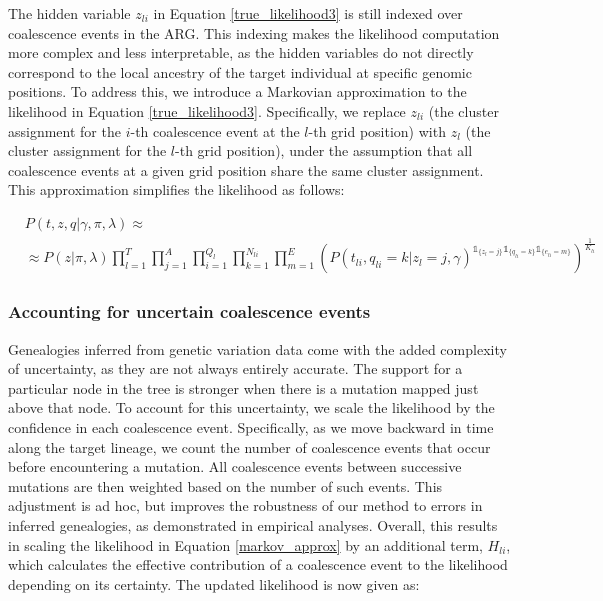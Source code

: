 The hidden variable \( z_{li} \) in Equation \ref{true_likelihood3} is still indexed over coalescence events in the ARG. This indexing makes the likelihood computation more complex and less interpretable, as the hidden variables do not directly correspond to the local ancestry of the target individual at specific genomic positions. To address this, we introduce a Markovian approximation to the likelihood in Equation \ref{true_likelihood3}. Specifically, we replace \( z_{li} \) (the cluster assignment for the $i$-th coalescence event at the $l$-th grid position) with \( z_l \) (the cluster assignment for the $l$-th grid position), under the assumption that all coalescence events at a given grid position share the same cluster assignment. This approximation simplifies the likelihood as follows:

\begingroup
\footnotesize
\begin{align}
    &P(t,z,q \vert \gamma, \pi, \lambda) \approx \nonumber \\
    & \approx P(z \vert \pi, \lambda) \prod_{l =1}^{T} \prod_{j = 1}^A \prod_{i=1}^{Q_l} \prod_{k =1}^{N_{li}} \prod_{m = 1}^E \left( P(t_{li},q_{li}=k \vert z_{l} = j, \gamma)^{\mathds{1}_{\{z_{l} = j\}} \mathds{1}_{\{q_{li} = k\}} \mathds{1}_{\{e_{li} = m\}}} \right) ^{\frac{1}{K_{li}}}
\label{markov_approx}
\end{align}
\endgroup

\subsubsection{Accounting for uncertain coalescence events}

Genealogies inferred from genetic variation data come with the added complexity of uncertainty, as they are not always entirely accurate. The support for a particular node in the tree is stronger when there is a mutation mapped just above that node. To account for this uncertainty, we scale the likelihood by the confidence in each coalescence event. Specifically, as we move backward in time along the target lineage, we count the number of coalescence events that occur before encountering a mutation. All coalescence events between successive mutations are then weighted based on the number of such events. This adjustment is ad hoc, but improves the robustness of our method to errors in inferred genealogies, as demonstrated in empirical analyses. Overall, this results in scaling the likelihood in Equation \ref{markov_approx} by an additional term, $H_{li}$, which calculates the effective contribution of a coalescence event to the likelihood depending on its certainty. The updated likelihood is now given as:

